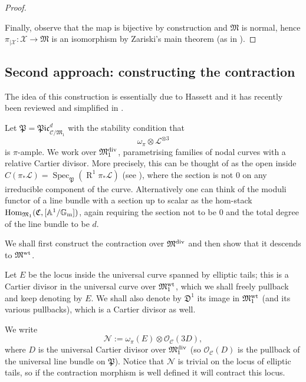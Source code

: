 \documentclass[11pt]{amsart}
\renewcommand{\to}{\rightarrow}
\newcommand{\Aaff}{\mathbb A}
\newcommand{\C}{\mathfrak C}
\newcommand{\cC}{\mathcal C}
\newcommand{\MM}{\mathfrak M}
\newcommand{\pP}{\mathfrak P}
\newcommand{\R}{\operatorname{R}}
\newcommand{\Gm}{\mathbb{G}_{\rm{m}}}
\newcommand{\Spec}{\operatorname{Spec}}
\newcommand{\Hom}{\operatorname{Hom}}
\theoremstyle{plain}
\theoremstyle{definition}
\begin{document}
\begin{proof}
\begin{enumerate}
\end{enumerate}
Finally, observe that the map is bijective by construction and $\mathfrak M$ is normal, hence $\pi_{|\mathcal X}\colon\mathcal X\to \mathfrak M$ is an isomorphism by Zariski's main theorem (as in \cite[\href{http://stacks.math.columbia.edu/tag/082I}{Tag 082I}]{stacks-project}).
 \end{proof}
 
\subsection{Second approach: constructing the contraction}

The idea of this construction is essentially due to Hassett \cite[\S2]{HassettHyeon} and it has recently been reviewed and simplified in \cite[\S3.7]{RSPW}.

Let $\mathfrak{P}=\mathfrak{Pic}^d_{\cC/\MM_1}$ with the stability condition that 
\[\omega_\pi\otimes \mathcal L^{\otimes 3}\]
 is $\pi$-ample. We work over $\MM_1^{\rm{div}}$, parametrising families of nodal curves with a relative Cartier divisor. More precisely, this can be thought of as the open inside $C(\pi_*\mathcal L)=\Spec_\pP(\R^1\pi_*\mathcal L)$ (see \cite{CLpfields}), where the section is not $0$ on any irreducible component of the curve. Alternatively one can think of the moduli functor of a line bundle with a section up to scalar as the hom-stack $\Hom_{\MM_1}(\C,[\Aaff^1/\Gm])$, again requiring the section not to be $0$ and the total degree of the line bundle to be $d$.

We shall first construct the contraction over $\MM^{\rm{div}}$ and then show that it descends to $\MM^{\rm{wt}}$.

Let $E$ be the locus inside the universal curve spanned by elliptic tails; this is a Cartier divisor in the universal curve over $\MM^{\rm{wt}}_1$, which we shall freely pullback and keep denoting by $E$. We shall also denote by $\mathfrak D^1$ its image in $\MM^{\rm{wt}}_1$ (and its various pullbacks), which is a Cartier divisor as well.

We write 
\begin{equation}\label{eq:linebundlecontraction}
\mathcal N:=\omega_{\pi}(E)\otimes\mathcal O_{\cC}(3D),
\end{equation} where $D$ is the universal Cartier divisor over $\MM_1^{\rm{div}}$ (so $\mathcal O_{\cC}(D)$ is the pullback of the universal line bundle on $\pP$).
Notice that $\mathcal N$ is trivial on the locus of elliptic tails, so if the contraction morphism is well defined it will contract this locus.
\end{document}
